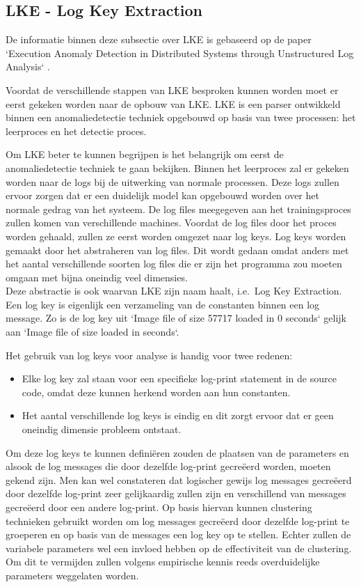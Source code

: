 \subsection{LKE - Log Key Extraction}
De informatie binnen deze subsectie over LKE is gebaseerd op de paper `Execution Anomaly Detection in Distributed Systems through Unstructured Log Analysis` \autocite{fu2009execution}.

Voordat de verschillende stappen van LKE besproken kunnen worden moet er eerst gekeken worden naar de opbouw van LKE. LKE is een parser ontwikkeld binnen een anomaliedetectie techniek opgebouwd op basis van twee processen: het leerproces en het detectie proces. 

Om LKE beter te kunnen begrijpen is het belangrijk om eerst de anomaliedetectie techniek te gaan bekijken. Binnen het leerproces zal er gekeken worden naar de logs bij de uitwerking van normale processen. Deze logs zullen ervoor zorgen dat er een duidelijk model kan opgebouwd worden over het normale gedrag van het systeem. De log files meegegeven aan het trainingsproces zullen komen van verschillende machines. Voordat de log files door het proces worden gehaald, zullen ze eerst worden omgezet naar log keys. Log keys worden gemaakt door het abstraheren van log files. Dit wordt gedaan omdat anders met het aantal verschillende soorten log files die er zijn het programma zou moeten omgaan met bijna oneindig veel dimensies.\\

Deze abstractie is ook waarvan LKE zijn naam haalt, i.e.\ Log Key Extraction. Een log key is eigenlijk een verzameling van de constanten binnen een log message. Zo is de log key uit `Image file of size 57717 loaded in 0 seconds` gelijk aan `Image file of size loaded in seconds`. 

Het gebruik van log keys voor analyse is handig voor twee redenen: 
\begin{itemize}
    \item Elke log key zal staan voor een specifieke log-print statement in de source code, omdat deze kunnen herkend worden aan hun constanten.
    \item Het aantal verschillende log keys is eindig en dit zorgt ervoor dat er geen oneindig dimensie probleem ontstaat.
\end{itemize}

Om deze log keys te kunnen definiëren zouden de plaatsen van de parameters en alsook de log messages die door dezelfde log-print gecreëerd worden, moeten gekend zijn. Men kan wel constateren dat logischer gewijs log messages gecreëerd door dezelfde log-print zeer gelijkaardig zullen zijn en verschillend van messages gecreëerd door een andere log-print. Op basis hiervan kunnen clustering technieken gebruikt worden om log messages gecreëerd door dezelfde log-print te groeperen en op basis van de messages een log key op te stellen. Echter zullen de variabele parameters wel een invloed hebben op de effectiviteit van de clustering. Om dit te vermijden zullen volgens empirische kennis reeds overduidelijke parameters weggelaten worden. 

